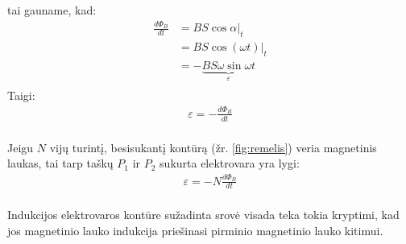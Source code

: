tai gauname, kad:
\begin{align*}
  \frac{d \Phi_{B}}{d t}
  &= BS \cos \alpha |_{t} \\
  &= BS \cos \left( \omega t \right) |_{t} \\
  &= - \underbrace{BS \omega \sin \omega t}_{\varepsilon} \\
\end{align*}
Taigi:
\begin{align*}
  \varepsilon = -\frac{d \Phi_{B}}{d t} \\
\end{align*}

\begin{defn}
  Jeigu $N$ vijų turintį, besisukantį kontūrą (žr.
  \ref{fig:remelis}) veria magnetinis laukas, tai tarp taškų $P_{1}$
  ir $P_{2}$ sukurta elektrovara yra lygi:
  \begin{align*}
    \varepsilon = - N \frac{d \Phi_{B}}{d t} \\
  \end{align*}
\end{defn}

\begin{defn}
  Indukcijos elektrovaros kontūre sužadinta srovė visada teka tokia
  kryptimi, kad jos magnetinio lauko indukcija priešinasi pirminio
  magnetinio lauko kitimui.
\end{defn}

